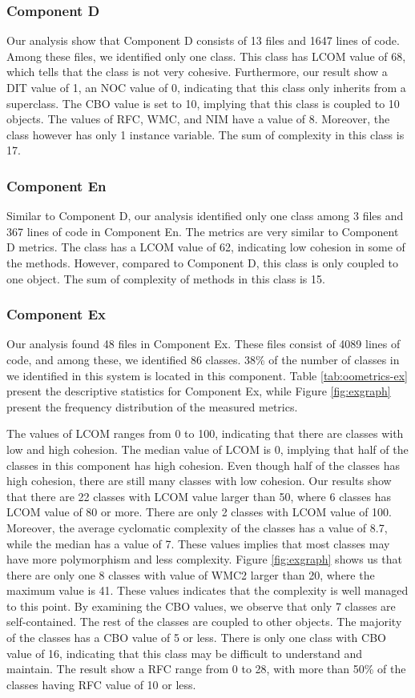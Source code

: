 \subsubsection{Component D}
Our analysis show that Component D consists of 13 files and 1647 lines of code. Among these files, we identified only one class. This class has LCOM value of 68, which tells that the class is not very cohesive. Furthermore, our result show a DIT value of 1, an NOC value of 0, indicating that this class only inherits from a superclass. The CBO value is set to 10, implying that this class is coupled to 10 objects. The values of RFC, WMC, and NIM have a value of 8. Moreover, the class however has only 1 instance variable. The sum of complexity in this class is 17.

\subsubsection{Component En}
Similar to Component D, our analysis identified only one class among 3 files and 367 lines of code in Component En. The metrics are very similar to Component D metrics. The class has a LCOM value of 62, indicating low cohesion in some of the methods. However, compared to Component D, this class is only coupled to one object. The sum of complexity of methods in this class is 15.


\subsubsection{Component Ex}
Our analysis found 48 files in Component Ex. These files consist of 4089 lines of code, and among these, we identified 86 classes. 38\% of the number of classes in we identified in this system is located in this component. Table \ref{tab:oometrics-ex} present the descriptive statistics for Component Ex, while Figure \ref{fig:exgraph} present the frequency distribution of the measured metrics. 

The values of LCOM ranges from 0 to 100, indicating that there are classes with low and high cohesion. The median value of LCOM is 0, implying that half of the classes in this component has high cohesion.  Even though half of the classes has high cohesion, there are still many classes with low cohesion. Our results show that there are 22 classes with LCOM value larger than 50, where 6 classes has LCOM value of 80 or more. There are only 2 classes with LCOM value of 100. Moreover, the average cyclomatic complexity of the classes has a value of 8.7, while the median has a value of 7. These values implies that most classes may have more polymorphism and less complexity. Figure \ref{fig:exgraph} shows us that there are only one 8 classes with value of WMC2 larger than 20, where the maximum value is 41. These values indicates that the complexity is well managed to this point. By examining the CBO values, we observe that only 7 classes are self-contained. The rest of the classes are coupled to other objects. The majority of the classes has a CBO value of 5 or less. There is only one class with CBO value of 16, indicating that this class may be difficult to understand and maintain. The result show a RFC range from 0 to 28, with more than 50\% of the classes having RFC value of 10 or less.

